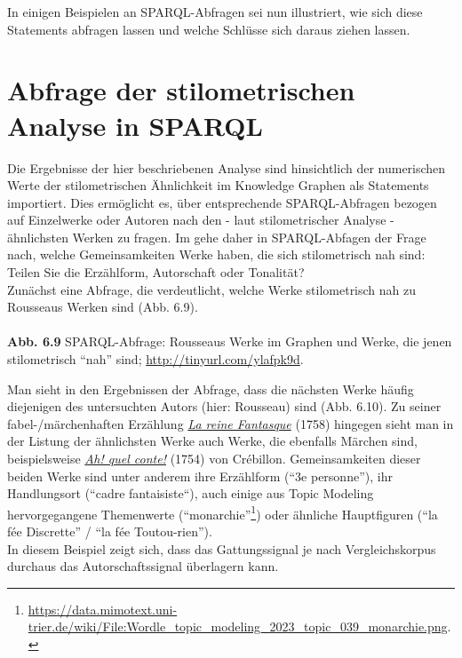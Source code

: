 \documentclass[
  letterpaper,
  DIV=11,
  numbers=noendperiod]{scrreprt}
\makeatletter
\newcommand*\pandocbounded[1]{%
  \sbox\pandoc@box{#1}%
  \Gscale@div\@tempa{\textheight}{\dimexpr\ht\pandoc@box+\dp\pandoc@box\relax}%
  \Gscale@div\@tempb{\linewidth}{\wd\pandoc@box}%
  \ifdim\@tempb\p@<\@tempa\p@\let\@tempa\@tempb\fi%
  \ifdim\@tempa\p@<\p@\scalebox{\@tempa}{\usebox\pandoc@box}%
  \else\usebox{\pandoc@box}%
  \fi%
}
\makeatother
\begin{document}
In einigen Beispielen an SPARQL-Abfragen sei nun illustriert, wie sich
diese Statements abfragen lassen und welche Schlüsse sich daraus ziehen
lassen.

\section{}\label{section}

\section{Abfrage der stilometrischen Analyse in
SPARQL}\label{abfrage-der-stilometrischen-analyse-in-sparql}

Die Ergebnisse der hier beschriebenen Analyse sind hinsichtlich der
numerischen Werte der stilometrischen Ähnlichkeit im Knowledge Graphen
als Statements importiert. Dies ermöglicht es, über entsprechende
SPARQL-Abfragen bezogen auf Einzelwerke oder Autoren nach den - laut
stilometrischer Analyse - ähnlichsten Werken zu fragen. Im gehe daher in
SPARQL-Abfagen der Frage nach, welche Gemeinsamkeiten Werke haben, die
sich stilometrisch nah sind: Teilen Sie die Erzählform, Autorschaft oder
Tonalität?\\
Zunächst eine Abfrage, die verdeutlicht, welche Werke stilometrisch nah
zu Rousseaus Werken sind (Abb. 6.9).\\
\pandocbounded{\texttt{[image: index\_files/mediabag/30AAAAASUVORK5CYII=.png]}}\\
\textbf{Abb. 6.9} SPARQL-Abfrage: Rousseaus Werke im Graphen und Werke,
die jenen stilometrisch ``nah'' sind; \url{http://tinyurl.com/ylafpk9d}.

Man sieht in den Ergebnissen der Abfrage, dass die nächsten Werke häufig
diejenigen des untersuchten Autors (hier: Rousseau) sind (Abb. 6.10). Zu
seiner fabel-/märchenhaften Erzählung
\href{https://data.mimotext.uni-trier.de/wiki/Item:Q1379}{\emph{La reine
Fantasque}} (1758) hingegen sieht man in der Listung der ähnlichsten
Werke auch Werke, die ebenfalls Märchen sind, beispielsweise
\href{https://data.mimotext.uni-trier.de/wiki/Item:Q1013}{\emph{Ah! quel
conte!}} (1754) von Crébillon. Gemeinsamkeiten dieser beiden Werke sind
unter anderem ihre Erzählform (``3e personne''), ihr Handlungsort
(``cadre fantaisiste``), auch einige aus Topic Modeling hervorgegangene
Themenwerte (``monarchie''\footnote{\url{https://data.mimotext.uni-trier.de/wiki/File:Wordle_topic_modeling_2023_topic_039_monarchie.png}.})
oder ähnliche Hauptfiguren (``la fée Discrette'' / ``la fée
Toutou-rien'').\\
In diesem Beispiel zeigt sich, dass das Gattungssignal je nach
Vergleichskorpus durchaus das Autorschaftssignal überlagern kann.
\end{document}
